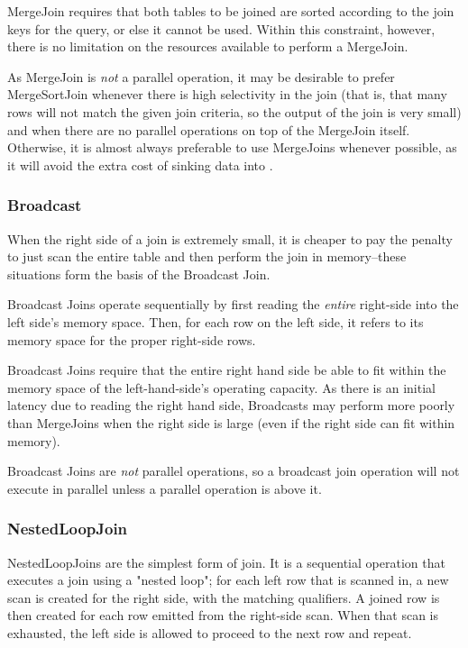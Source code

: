 MergeJoin requires that both tables to be joined are sorted according to the join keys for the query, or else it cannot be used. Within this constraint, however, there is no limitation on the resources available to perform a MergeJoin.

As MergeJoin is \emph{not} a parallel operation, it may be desirable to prefer MergeSortJoin whenever there is high selectivity in the join (that is, that many rows will not match the given join criteria, so the output of the join is very small) and when there are no parallel operations on top of the MergeJoin itself. Otherwise, it is almost always preferable to use MergeJoins whenever possible, as it will avoid the extra cost of sinking data into \temp.

\subsubsection{Broadcast}
When the right side of a join is extremely small, it is cheaper to pay the penalty to just scan the entire table and then perform the join in memory--these situations form the basis of the Broadcast Join.

Broadcast Joins operate sequentially by first reading the \emph{entire} right-side into the left side's memory space. Then, for each row on the left side, it refers to its memory space for the proper right-side rows.

Broadcast Joins require that the entire right hand side be able to fit within the memory space of the left-hand-side's operating capacity. As there is an initial latency due to reading the right hand side, Broadcasts may perform more poorly than MergeJoins when the right side is large (even if the right side can fit within memory).

Broadcast Joins are \emph{not} parallel operations, so a broadcast join operation will not execute in parallel unless a parallel operation is above it.

\subsubsection{NestedLoopJoin}
NestedLoopJoins are the simplest form of join. It is a sequential operation that executes a join using a "nested loop"; for each left row that is scanned in, a new scan is created for the right side, with the matching qualifiers. A joined row is then created for each row emitted from the right-side scan. When that scan is exhausted, the left side is allowed to proceed to the next row and repeat.

